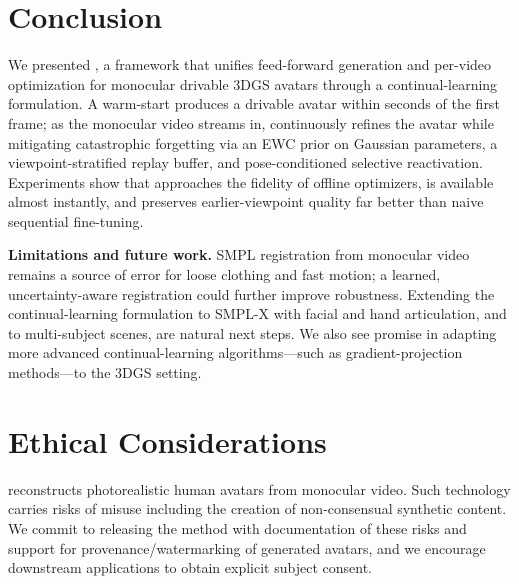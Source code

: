 \section{Conclusion}\label{sec:conclusion}

We presented \method{}, a framework that unifies feed-forward generation
and per-video optimization for monocular drivable 3DGS avatars through a
continual-learning formulation. A warm-start produces a drivable avatar
within seconds of the first frame; as the monocular video streams in,
\method{} continuously refines the avatar while mitigating catastrophic
forgetting via an EWC prior on Gaussian parameters, a viewpoint-stratified
replay buffer, and pose-conditioned selective reactivation. Experiments
show that \method{} approaches the fidelity of offline optimizers, is
available almost instantly, and preserves earlier-viewpoint quality far
better than naive sequential fine-tuning.

\textbf{Limitations and future work.} SMPL registration from monocular
video remains a source of error for loose clothing and fast motion; a
learned, uncertainty-aware registration could further improve robustness.
Extending the continual-learning formulation to SMPL-X with facial and
hand articulation, and to multi-subject scenes, are natural next steps.
We also see promise in adapting more advanced continual-learning
algorithms---such as gradient-projection methods---to the 3DGS setting.

\section*{Ethical Considerations}
\method{} reconstructs photorealistic human avatars from monocular video.
Such technology carries risks of misuse including the creation of
non-consensual synthetic content. We commit to releasing the method with
documentation of these risks and support for provenance/watermarking of
generated avatars, and we encourage downstream applications to obtain
explicit subject consent.
